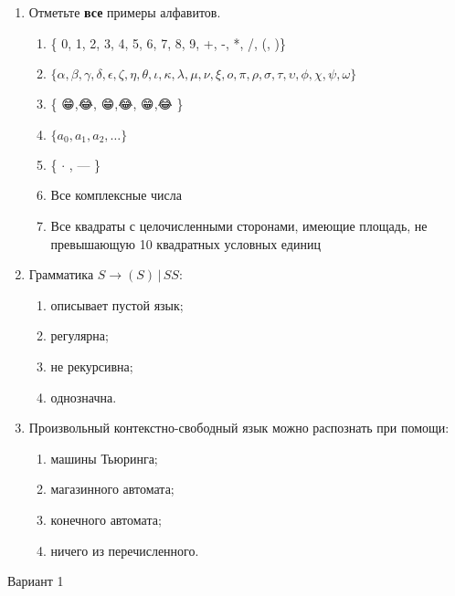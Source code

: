 \documentclass[12pt]{article}
\begin{document}
\begin{enumerate}
    \item Отметьте \textbf{все} примеры алфавитов.
    \begin{enumerate}
        \item \{ 0, 1, 2, 3, 4, 5, 6, 7, 8, 9, +, -, *, /, (, )\}
        \item $\{ \alpha, \beta, \gamma, \delta, \epsilon, \zeta, \eta, \theta, \iota, \kappa, \lambda, \mu, \nu, \xi, o, \pi, \rho, \sigma, \tau, \upsilon, \phi, \chi, \psi, \omega \} $
        \item \{  😁,😂, 😁,😂, 😁,😂 \}
        \item $\{ a_0, a_1, a_2, \dots \}$
        \item \{ $\cdot$ , --- \}
        \item Все комплексные числа
        \item Все квадраты с целочисленными сторонами, имеющие площадь, не превышающую 10 квадратных условных единиц
    \end{enumerate}

    \item Грамматика $S \rightarrow ( S ) \, | \, S S  $:
    \begin{enumerate}
        \item описывает пустой язык; 
        \item регулярна;
        \item не рекурсивна;
        \item однозначна.
    \end{enumerate}

    \item Произвольный контекстно-свободный язык можно распознать при помощи: 
    \begin{enumerate}
        \item машины Тьюринга;
        \item магазинного автомата;
        \item конечного автомата;
        \item ничего из перечисленного.
    \end{enumerate}

\end{enumerate}

\pagebreak

\medskip
{\Large Вариант 1}
\medskip
\end{document}
